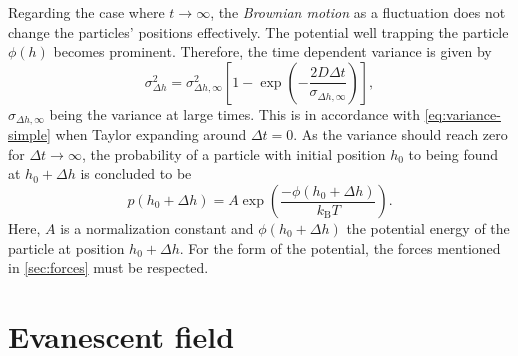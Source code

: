 \documentclass[.../bericht]{subfilies}
\begin{document}
           Regarding the case where $t\rightarrow \infty$, the \textit{Brownian motion} as a fluctuation does not change the particles' positions effectively. The potential well trapping the particle $\phi (h)$ becomes prominent. Therefore, the time dependent variance is given by
           \begin{equation*}
             \sigma_{\Delta h}^2=\sigma_{\Delta h, \infty}^2 \left[ 1-\exp\left( - \frac{2D\Delta t}{\sigma_{\Delta h, \infty}}\right)\right],
           \end{equation*}
           $\sigma_{\Delta h,\infty}$ being the variance at large times. This is in accordance with \cref{eq:variance-simple} when Taylor expanding around $\Delta t = 0$. As the variance should reach zero for $\Delta t \rightarrow \infty$, the probability of a particle with initial position $h_0$ to being found at $h_0 +\Delta h$ is concluded to be
           \begin{equation*}
              p(h_0+ \Delta h)=A\exp\left( \frac{-\phi (h_0+\Delta h)}{k_\mathrm{B}T}\right).
           \end{equation*}
           Here, $A$ is a normalization constant and $\phi ( h_0 + \Delta h)$ the potential energy of the particle at position $h_0 + \Delta h$. For the form of the potential, the forces mentioned in \cref{sec:forces} must be respected. \cite{walz}



      \section{Evanescent field}
      \label{sec:evanenscent}
\end{document}
